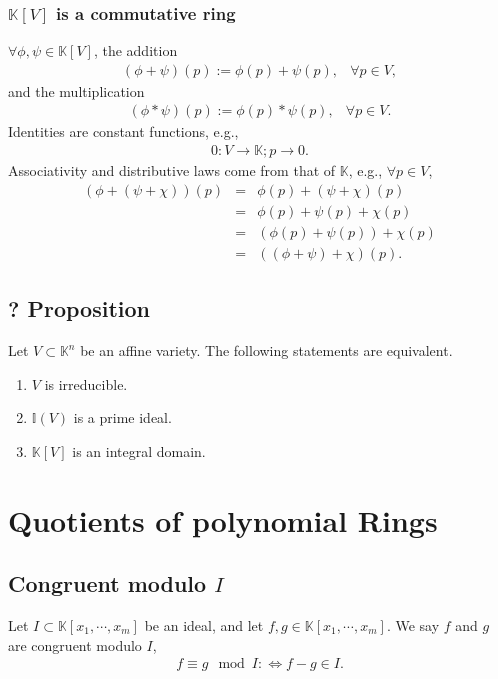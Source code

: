 \documentclass[11pt]{book}
\begin{document}
\subsubsection{$\mathbb{K}[V]$ is a commutative ring}
$\forall \phi, \psi \in \mathbb{K}[V]$, the addition
\begin{eqnarray}
(\phi + \psi) (p) := \phi(p) + \psi(p), &\forall p \in V,
\end{eqnarray}
and the multiplication
\begin{eqnarray}
(\phi * \psi) (p) := \phi(p) * \psi(p), &\forall p \in V.
\end{eqnarray}
Identities are constant functions, e.g.,
\begin{eqnarray}
0 : V \to \mathbb{K}; p \to 0.
\end{eqnarray}
Associativity and distributive laws come from that of $\mathbb{K}$, e.g., $\forall p \in V$,
\begin{eqnarray}
(\phi + (\psi + \chi) ) (p) &=& \phi(p) + (\psi + \chi)(p)\\
&=& \phi(p) + \psi(p) + \chi(p)\\
&=& (\phi(p) + \psi(p)) + \chi(p)\\
&=& ((\phi + \psi) + \chi)(p).
\end{eqnarray}

\subsection{? Proposition}
Let $V \subset \mathbb{K}^n$ be an affine variety.
The following statements are equivalent.
\begin{enumerate}
\item $V$ is irreducible.
\item $\mathbb{I}(V)$ is a prime ideal.
\item $\mathbb{K}[V]$ is an integral domain.
\end{enumerate}






\section{Quotients of polynomial Rings}
\subsection{Congruent modulo $I$}
Let $I \subset \mathbb{K}[x_1, \cdots, x_m]$ be an ideal, and let $f,g \in \mathbb{K}[x_1, \cdots, x_m]$.
We say $f$ and $g$ are congruent modulo $I$,
\begin{eqnarray}
f \equiv g \mod I :\Leftrightarrow f-g \in I.
\end{eqnarray}
\end{document}
